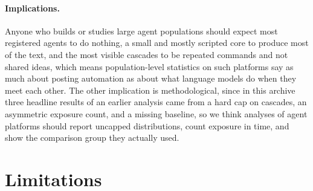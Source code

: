 \documentclass{article}
\begin{document}
\paragraph{Implications.}
Anyone who builds or studies large agent populations should expect most registered agents to do nothing, a small and mostly scripted core to produce most of the text, and the most visible cascades to be repeated commands and not shared ideas, which means population-level statistics on such platforms say as much about posting automation as about what language models do when they meet each other. The other implication is methodological, since in this archive three headline results of an earlier analysis came from a hard cap on cascades, an asymmetric exposure count, and a missing baseline, so we think analyses of agent platforms should report uncapped distributions, count exposure in time, and show the comparison group they actually used.

\section{Limitations}
\label{sec:limitations}
\end{document}
